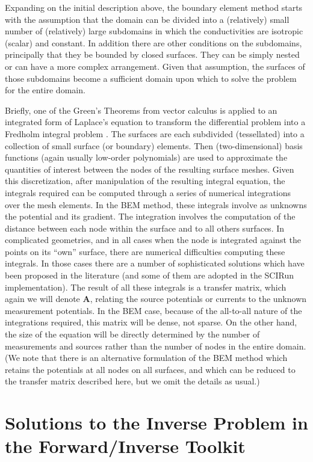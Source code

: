 Expanding on the initial description above, the boundary element method starts with the assumption
that the domain can be divided into a (relatively) small number of
(relatively) large subdomains in which the conductivities are isotropic
(scalar) and constant. In addition there are other conditions on the
subdomains, principally that they be bounded by closed surfaces.
They can be simply nested or can have a more complex arrangement. Given
that assumption, the surfaces of those subdomains become a sufficient
domain upon which to solve the problem for the entire domain.


Briefly, one of the Green's Theorems from vector calculus is applied to an
integrated form of Laplace's equation to transform the differential problem
into a Fredholm integral problem \cite{RSM:Bar77}. The surfaces are each
subdivided (tessellated) into a collection of small surface (or boundary)
elements. Then (two-dimensional) basis functions (again usually low-order
polynomials) are used to approximate the quantities of interest between the
nodes of the resulting surface meshes. Given this discretization, after
manipulation of the resulting integral equation, the integrals required can
be computed through a series of numerical integrations over the mesh
elements. In the BEM method, these integrals involve as unknowns the
potential and its gradient. The integration involves the computation of the
distance between each node within the surface and to all others surfaces.
In complicated geometries, and in all cases when the node is integrated
against the points on its ``own'' surface, there are numerical difficulties
computing these integrals. In those cases there are a number of
sophisticated solutions which have been proposed in the literature (and
some of them are adopted in the SCIRun implementation). The result of all
these integrals is a transfer matrix, which again we will denote
$\mathbf{A}$, relating the source potentials or currents to the unknown
measurement potentials. In the BEM case, because of the all-to-all nature
of the integrations required, this matrix will be dense, not sparse. On the
other hand, the size of the equation will be directly determined by the
number of measurements and sources rather than the number of nodes in the
entire domain. (We note that there is an alternative formulation of the BEM
method which retains the potentials at all nodes on all surfaces, and which
can be reduced to the transfer matrix described here, but we omit the
details as usual.)


\section{Solutions to the Inverse Problem in the Forward/Inverse Toolkit}

